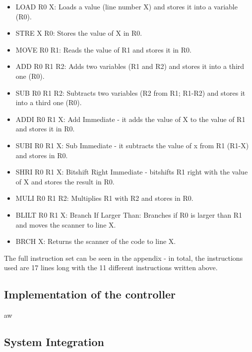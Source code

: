 \documentclass[12pt,a4paper]{article}
\begin{document}
	\begin{itemize}
			
			\item LOAD R0 X: Loads a value (line number X) and stores it into a variable (R0).
			\item STRE X R0: Stores the value of X in R0.
			\item MOVE R0 R1: Reads the value of R1 and stores it in R0.
			\item ADD R0 R1 R2: Adds two variables (R1 and R2) and stores it into a third one (R0).
			\item SUB R0 R1 R2: Subtracts two variables (R2 from R1; R1-R2) and stores it into a third one (R0).
			
			\item ADDI R0 R1 X: Add Immediate - it adds the value of X to the value of R1 and stores it in R0.
			\item SUBI R0 R1 X: Sub Immediate - it subtracts the value of x from R1 (R1-X) and stores in R0.
			\item SHRI R0 R1 X: Bitshift Right Immediate - bitshifts R1 right with the value of X and stores the result in R0.
			\item MULI R0 R1 R2: Multiplies R1 with R2 and stores in R0.
			\item BLILT R0 R1 X: Branch If Larger Than: Branches if R0 is larger than R1 and moves the scanner to line X.
			\item BRCH X: Returns the scanner of the code to line X.
		\end{itemize}
	The full instruction set can be seen in the appendix - in total, the instructions used are 17 lines long with the 11 different instructions written above.
\subsection{Implementation of the controller}
	aw
\subsection{System Integration}
	
\end{document}
